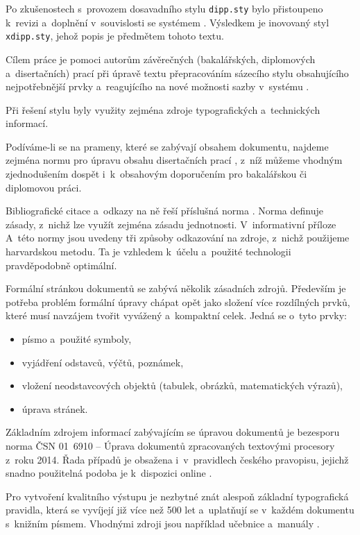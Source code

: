 \documentclass[twoside,12pt]{article}%
\begin{document}
Po zkušenostech s~provozem dosavadního stylu \texttt{dipp.sty} bylo přistoupeno
k~revizi a~doplnění v~souvislosti se systémem \XeLaTeX. Výsledkem je inovovaný
styl \texttt{xdipp.sty}, jehož popis je předmětem tohoto textu.


Cílem práce je pomoci autorům závěrečných (bakalářských, diplomových
a~disertačních) prací při úpravě textu přepracováním sázecího stylu obsahujícího
nejpotřebnější prvky a~reagujícího na nové možnosti sazby v~systému \XeLaTeX.

Při řešení stylu byly využity zejména zdroje typografických a~technických
informací.

Podíváme-li se na prameny, které se zabývají obsahem dokumentu, najdeme
zejména normu pro úpravu obsahu disertačních prací \cite{csn7144}, z~níž
můžeme vhodným zjednodušením dospět i~k~obsahovým doporučením pro bakalářskou
či diplomovou práci.

Bibliografické citace a~odkazy na ně řeší příslušná norma \cite{csniso690}.
Norma definuje zásady, z~nichž lze využít zejména zásadu jednotnosti. V~informativní
příloze A~této normy jsou uvedeny tři způsoby odkazování na zdroje, z~nichž
použijeme harvardskou metodu. Ta je vzhledem k~účelu a~použité technologii
pravděpodobně optimální.

Formální stránkou dokumentů se zabývá několik zásadních zdrojů. Především je potřeba
problém formální úpravy chápat opět jako složení více rozdílných prvků, které
musí navzájem tvořit vyvážený a~kompaktní celek. Jedná se o~tyto prvky:
\begin{itemize}
     \item písmo a~použité symboly,
     \item vyjádření odstavců, výčtů, poznámek,
     \item vložení neodstavcových objektů (tabulek, obrázků, matematických výrazů),
     \item úprava stránek.
\end{itemize}

Základním zdrojem informací zabývajícím se úpravou dokumentů je bezesporu
norma ČSN 01~6910 -- Úprava dokumentů zpracovaných textovými procesory z~roku
2014. Řada případů je obsažena i~v~pravidlech českého pravopisu, jejichž
snadno použitelná podoba je k~dispozici online \cite{pravidla}.

Pro vytvoření kvalitního výstupu je nezbytné znát alespoň základní typografická
pravidla, která se vyvíjejí již více než 500 let a~uplatňují se v~každém
dokumentu s~knižním písmem. Vhodnými zdroji jsou například učebnice a~manuály
\cite{pop, beran, latzac}.
\end{document}
